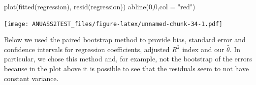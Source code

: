 \documentclass[
]{article}
\newenvironment{Shaded}{\begin{snugshade}}{\end{snugshade}}
\newcommand{\AttributeTok}[1]{\textcolor[rgb]{0.77,0.63,0.00}{#1}}
\newcommand{\DecValTok}[1]{\textcolor[rgb]{0.00,0.00,0.81}{#1}}
\newcommand{\FunctionTok}[1]{\textcolor[rgb]{0.00,0.00,0.00}{#1}}
\newcommand{\NormalTok}[1]{#1}
\newcommand{\StringTok}[1]{\textcolor[rgb]{0.31,0.60,0.02}{#1}}
\begin{document}
\begin{Shaded}
\begin{Highlighting}[]
\FunctionTok{plot}\NormalTok{(}\FunctionTok{fitted}\NormalTok{(regression), }\FunctionTok{resid}\NormalTok{(regression))}
\FunctionTok{abline}\NormalTok{(}\DecValTok{0}\NormalTok{,}\DecValTok{0}\NormalTok{,}\AttributeTok{col =} \StringTok{"red"}\NormalTok{)}
\end{Highlighting}
\end{Shaded}

\texttt{[image: ANUASS2TEST\_files/figure-latex/unnamed-chunk-34-1.pdf]}

Below we used the paired bootstrap method to provide bias, standard
error and confidence intervals for regression coefficients, adjusted
\(R^2\) index and our \(\hat{\theta}\). In particular, we chose this
method and, for example, not the bootstrap of the errors because in the
plot above it is possible to see that the residuals seem to not have
constant variance.
\end{document}
